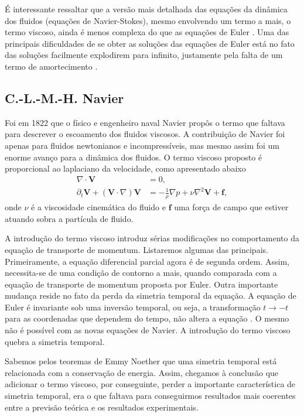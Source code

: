 É interessante ressaltar que a versão mais detalhada das equações da dinâmica dos fluidos (equações de Navier-Stokes), mesmo envolvendo um termo a mais, o termo viscoso, ainda é menos complexa do que as equações de Euler \cite{stewart2013great}. Uma das principais dificuldades de se obter as soluções das equações de Euler está no fato das soluções facilmente explodirem para infinito, justamente pela falta de um termo de amortecimento \cite{stewart2013great}. 

\subsection{C.-L.-M.-H. Navier}
Foi em 1822 que o físico e engenheiro naval Navier propôs o termo que faltava para descrever o escoamento dos fluidos viscosos. A contribuição de Navier foi apenas para fluidos newtonianos e incompressíveis, mas mesmo assim foi um enorme avanço para a dinâmica dos fluidos. O termo viscoso proposto é proporcional ao laplaciano da velocidade, como apresentado abaixo
\begin{align*}
    \nabla \cdot \textbf{V} &= 0,\\
    \partial_t \textbf{V} + (\textbf{V}\cdot\nabla)\textbf{V} &=-\frac{1}{\rho} \nabla p + \nu \nabla^2\textbf{V} + \textbf{f},
\end{align*}
onde $\nu$ é a viscosidade cinemática do fluido e $\textbf{f}$ uma força de campo que estiver atuando sobra a partícula de fluido.

A introdução do termo viscoso introduz sérias modificações no comportamento da equação de transporte de momentum. Listaremos algumas das principais. Primeiramente, a equação diferencial parcial agora é de segunda ordem. Assim, necessita-se de uma condição de contorno a mais, quando comparada com a equação de transporte de momentum proposta por Euler. Outra importante mudança reside no fato da perda da simetria temporal da equação. A equação de Euler é invariante sob uma inversão temporal, ou seja, a transformação $t\longrightarrow -t$ para as coordenadas que dependem do tempo, não altera a equação \cite{frisch1995turbulence}. O mesmo não é possível com as novas equações de Navier. A introdução do termo viscoso quebra a simetria temporal.

Sabemos pelos teoremas de Emmy Noether \cite{lemos2007mecanica, goldstein2002classical} que uma simetria temporal está relacionada com a conservação de energia. Assim, chegamos à conclusão que adicionar o termo viscoso, por conseguinte, perder a importante característica de simetria temporal, era o que faltava para conseguirmos resultados mais coerentes entre a previsão teórica e os resultados experimentais.

